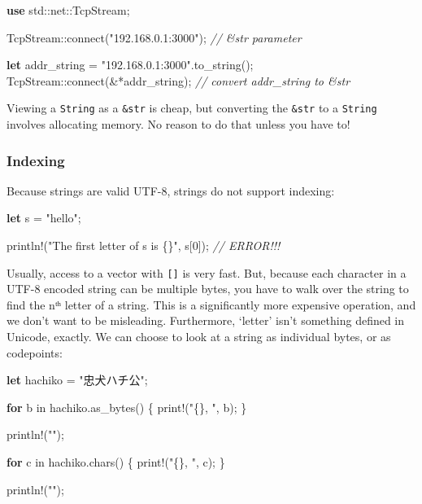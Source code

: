 \documentclass[a4paper,]{book}
\newenvironment{Shaded}{\begin{snugshade}}{\end{snugshade}}
\newcommand{\KeywordTok}[1]{\textcolor[rgb]{0.13,0.29,0.53}{\textbf{{#1}}}}
\newcommand{\DecValTok}[1]{\textcolor[rgb]{0.00,0.00,0.81}{{#1}}}
\newcommand{\StringTok}[1]{\textcolor[rgb]{0.31,0.60,0.02}{{#1}}}
\newcommand{\CommentTok}[1]{\textcolor[rgb]{0.56,0.35,0.01}{\textit{{#1}}}}
\newcommand{\OtherTok}[1]{\textcolor[rgb]{0.56,0.35,0.01}{{#1}}}
\newcommand{\NormalTok}[1]{{#1}}
\begin{document}
\begin{Shaded}
\begin{Highlighting}[]
\KeywordTok{use} \NormalTok{std::net::TcpStream;}

\NormalTok{TcpStream::connect(}\StringTok{"192.168.0.1:3000"}\NormalTok{); }\CommentTok{// &str parameter}

\KeywordTok{let} \NormalTok{addr_string = }\StringTok{"192.168.0.1:3000"}\NormalTok{.to_string();}
\NormalTok{TcpStream::connect(&*addr_string); }\CommentTok{// convert addr_string to &str}
\end{Highlighting}
\end{Shaded}

Viewing a \texttt{String} as a \texttt{\&str} is cheap, but converting
the \texttt{\&str} to a \texttt{String} involves allocating memory. No
reason to do that unless you have to!

\subsubsection{Indexing}\label{indexing}

Because strings are valid UTF-8, strings do not support indexing:

\begin{Shaded}
\begin{Highlighting}[]
\KeywordTok{let} \NormalTok{s = }\StringTok{"hello"}\NormalTok{;}

\OtherTok{println!}\NormalTok{(}\StringTok{"The first letter of s is \{\}"}\NormalTok{, s[}\DecValTok{0}\NormalTok{]); }\CommentTok{// ERROR!!!}
\end{Highlighting}
\end{Shaded}

Usually, access to a vector with \texttt{{[}{]}} is very fast. But,
because each character in a UTF-8 encoded string can be multiple bytes,
you have to walk over the string to find the nᵗʰ letter of a string.
This is a significantly more expensive operation, and we don't want to
be misleading. Furthermore, `letter' isn't something defined in Unicode,
exactly. We can choose to look at a string as individual bytes, or as
codepoints:

\begin{Shaded}
\begin{Highlighting}[]
\KeywordTok{let} \NormalTok{hachiko = }\StringTok{"忠犬ハチ公"}\NormalTok{;}

\KeywordTok{for} \NormalTok{b in hachiko.as_bytes() \{}
    \OtherTok{print!}\NormalTok{(}\StringTok{"\{\}, "}\NormalTok{, b);}
\NormalTok{\}}

\OtherTok{println!}\NormalTok{(}\StringTok{""}\NormalTok{);}

\KeywordTok{for} \NormalTok{c in hachiko.chars() \{}
    \OtherTok{print!}\NormalTok{(}\StringTok{"\{\}, "}\NormalTok{, c);}
\NormalTok{\}}

\OtherTok{println!}\NormalTok{(}\StringTok{""}\NormalTok{);}
\end{Highlighting}
\end{Shaded}
\end{document}
